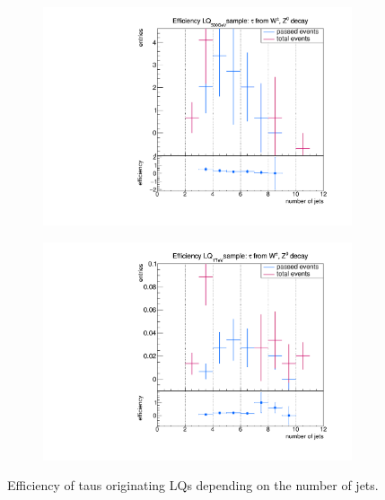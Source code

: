 %
%
\begin{figure}
  \centering
                \begin{subfigure}[t]{0.49\textwidth}
                \includegraphics[width=\textwidth]{figures/plots/LQ75/Divided_promptnjets.pdf}
                \label{Dividedprompt:signal:njetsLQ75}
                \end{subfigure}
                \begin{subfigure}[t]{0.49\textwidth}
                \includegraphics[width=\textwidth]{figures/plots/LQ76/Divided_promptnjets.pdf}
                \label{Dividedprompt:signal:njetsLQ76}
                \end{subfigure}
\caption[Efficiency of taus originating from LQs for the LQ signal events.]{Efficiency of taus originating LQs depending on the number of jets.}
\label{Divided:prompt:njets}
\end{figure}
